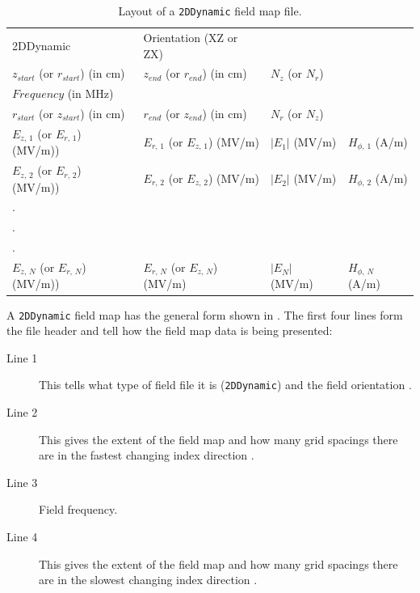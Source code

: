 \begin{table}[h!]
    \caption{Layout of a \texttt{2DDynamic} field map file.}
    \label{tab:2DDynamic}
    \begin{center}
    \begin{tabular}{llll}
      \hline
      2DDynamic & Orientation (XZ or ZX) & & \\
      $z_{start}$ (or $r_{start}$) (in cm) & $z_{end}$ (or $r_{end}$) (in cm) & $N_{z}$ (or $N_{r}$)& \\
      $Frequency$ (in MHz) & & & \\
      $r_{start}$ (or $z_{start}$) (in cm) & $r_{end}$ (or $z_{end}$) (in cm) & $N_{r}$ (or $N_{z}$)& \\
      $E_{z,\,1}$ (or $E_{r,\,1}$) (MV/m)) & $E_{r,\,1}$ (or $E_{z,\,1}$) (MV/m) & $|E_1|$ (MV/m) & $H_{\phi,\,1}$ (A/m) \\
      $E_{z,\,2}$ (or $E_{r,\,2}$) (MV/m)) & $E_{r,\,2}$ (or $E_{z,\,2}$) (MV/m) & $|E_2|$ (MV/m) & $H_{\phi,\,2}$ (A/m) \\
      . & & \\
      . & & \\
      . & & \\
      $E_{z,\,N}$ (or $E_{r,\,N}$) (MV/m)) & $E_{r,\,N}$ (or $E_{z,\,N}$) (MV/m) & $|E_N|$ (MV/m) & $H_{\phi,\,N}$ (A/m) \\
      \hline
    \end{tabular}
    \end{center}
\end{table}

A \texttt{2DDynamic} field map has the general form shown in . The first four lines form
the file header and tell \opalt how the field map data is being presented:

\begin{description}
\item[Line 1] This tells \opalt what type of field file it is (\texttt{2DDynamic}) and the field orientation
  .
\item[Line 2] This gives the extent of the field map and how many grid spacings there are in the fastest changing
  index direction .
\item[Line 3] Field frequency.
\item[Line 4] This gives the extent of the field map and how many grid spacings there are in the slowest changing
  index direction .
\end{description}

